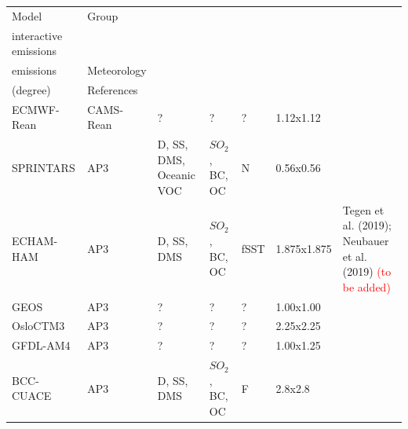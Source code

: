 \documentclass[journal abbreviation, manuscript]{copernicus}
\begin{document}
\begin{table}[]
 \begin{tabularx}{\textwidth}{llllllX}
  \toprule
  Model      & Group     & \begin{tabular}[c]{@{}l@{}}Natural \\ interactive emissions\end{tabular} & \begin{tabular}[c]{@{}l@{}}Anthropogenic \\ emissions\end{tabular} & Meteorology & \begin{tabular}[c]{@{}l@{}}LatxLon \\ (degree)\end{tabular} & References                                                          \\ \midrule
  ECMWF-Rean & CAMS-Rean & ?                          & ?                          & ?           & 1.12x1.12                  &                                                                     \\
  SPRINTARS  & AP3       & D, SS, DMS, Oceanic VOC      & $SO_{2}$, BC, OC                & N           & 0.56x0.56                  & \cite{takemura2000global,takemura2002single,takemura2005simulation} \\
  ECHAM-HAM  & AP3       & D, SS, DMS                          & $SO_{2}$, BC, OC                          & fSST           & 1.875x1.875                  &  Tegen et al. (2019); Neubauer et al. (2019)   \textcolor{red}{(to be added)}                                        \\
  GEOS       & AP3       & ?                          & ?                          & ?           & 1.00x1.00                  &                                                                     \\
  OsloCTM3   & AP3       & ?                          & ?                          & ?           & 2.25x2.25                  & \cite{lund2018concentrations,myhre2009modelled}                     \\
  GFDL-AM4   & AP3       & ?                          & ?                          & ?           & 1.00x1.25                  &                                                                     \\
  BCC-CUACE  & AP3       & D, SS, DMS                          & $SO_{2}$, BC, OC                         & F           & 2.8x2.8                  & \cite{zhang2012simulation,zhang2014application,wang2014improvement}                                                                    \\

\end{tabularx}
\end{table}
\end{document}
